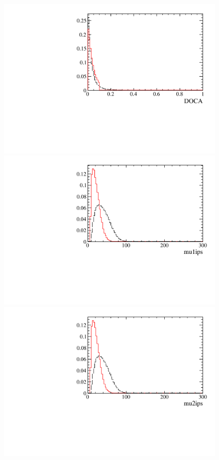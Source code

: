 \begin{figure} [htb!]
\begin{center}
\includegraphics[scale=0.20]{figs/DOCAPARTIAL2pipi.pdf}
\includegraphics[scale=0.20]{figs/mu1ipsPARTIAL2pipi.pdf}
\includegraphics[scale=0.20]{figs/mu2ipsPARTIAL2pipi.pdf}

\end{center}
\end{figure}
